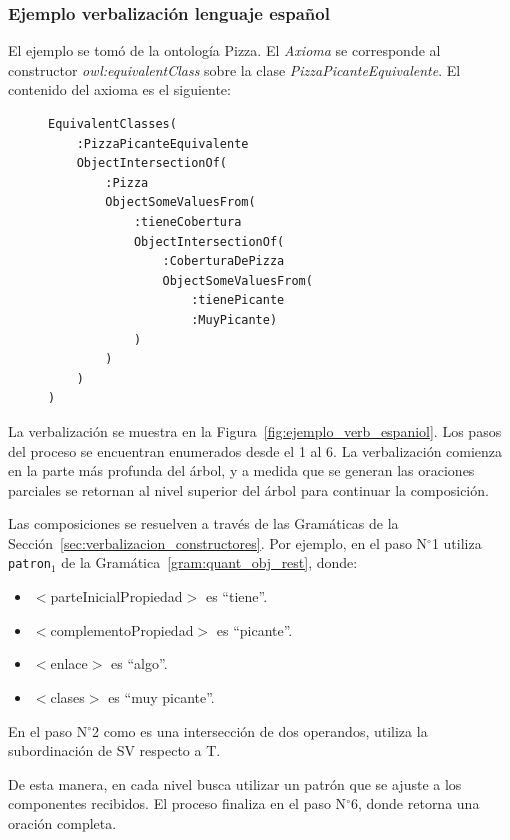 \subsubsection{Ejemplo verbalización lenguaje español}
El ejemplo se tomó de la ontología Pizza. El \textit{Axioma }se corresponde al constructor \emph{owl:equivalentClass} sobre la clase \emph{PizzaPicanteEquivalente}. El contenido del axioma es el siguiente: 
\begin{figure}[H]
\begin{verbatim}
EquivalentClasses(
    :PizzaPicanteEquivalente
    ObjectIntersectionOf(
        :Pizza
        ObjectSomeValuesFrom(
            :tieneCobertura
            ObjectIntersectionOf(
                :CoberturaDePizza
                ObjectSomeValuesFrom(
                    :tienePicante
                    :MuyPicante)
            )
        )
    )
)    
\end{verbatim}
\label{fig:axioma_pizza_ejemplo}
\end{figure}
La verbalización se muestra en la Figura~\ref{fig:ejemplo_verb_espaniol}.
Los pasos del proceso se encuentran enumerados desde el 1 al 6. La verbalización comienza en la parte más profunda del árbol, y a medida que se generan las oraciones parciales se retornan al nivel superior del árbol para continuar la composición.

Las composiciones se resuelven a través de las Gramáticas de la Sección~\ref{sec:verbalizacion_constructores}. Por ejemplo, en el paso N$^\circ$1 utiliza {\tt patron$_1$} de la Gramática~\ref{gram:quant_obj_rest}, donde:
\begin{itemize}
    \item $<$parteInicialPropiedad$>$ es ``tiene''.
    \item $<$complementoPropiedad$>$ es ``picante''.
    \item $<$enlace$>$ es ``algo''.
    \item $<$clases$>$ es ``muy picante''.
\end{itemize}

En el paso N$^\circ$2 como es una intersección de dos operandos, utiliza la subordinación de SV respecto a T.

De esta manera, en cada nivel busca utilizar un patrón que se ajuste a los componentes recibidos. El proceso finaliza en el paso N$^\circ$6, donde retorna una oración completa.

